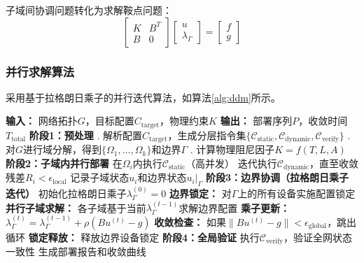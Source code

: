 \documentclass[12pt,a4paper]{article}
\begin{document}
子域间协调问题转化为求解鞍点问题：
\begin{equation}
    \begin{bmatrix}
        K & B^T \\
        B & 0
    \end{bmatrix}
    \begin{bmatrix}
        u \\
        \lambda_{\Gamma}
    \end{bmatrix}
    =
    \begin{bmatrix}
        f \\
        g
    \end{bmatrix}
    \label{eq:saddle_point}
\end{equation}

\subsubsection{并行求解算法}
采用基于拉格朗日乘子的并行迭代算法，如算法\ref{alg:ddm}所示。

\begin{algorithm}[htbp]
\caption{基于拉格朗日乘子的网络配置并行部署算法}
\label{alg:ddm}
\begin{algorithmic}[1]
\State \textbf{输入：} 网络拓扑$G$，目标配置$C_{\text{target}}$，物理约束$K$
\State \textbf{输出：} 部署序列$P$，收敛时间$T_{\text{total}}$
\State
\State \textbf{阶段1：预处理}
. 解析配置$C_{\text{target}}$，生成分层指令集$\{\mathcal{C}_{\text{static}}, \mathcal{C}_{\text{dynamic}}, \mathcal{C}_{\text{verify}}\}$
. 对$G$进行域分解，得到$\{\Omega_1, \ldots, \Omega_k\}$和边界$\Gamma$
. 计算物理阻尼因子$K = f(T, L, A)$
\State
\State \textbf{阶段2：子域内并行部署}
\State {}
\State \quad 在$\Omega_i$内执行$\mathcal{C}_{\text{static}}$（高并发）
\State \quad 迭代执行$\mathcal{C}_{\text{dynamic}}$，直至收敛残差$R_i < \epsilon_{\text{local}}$
\State \quad 记录子域状态$u_i$和边界状态$u_i|_{\Gamma}$
\State \EndFor
\State
\State \textbf{阶段3：边界协调（拉格朗日乘子迭代）}
\State 初始化拉格朗日乘子$\lambda_{\Gamma}^{(0)} = 0$
\State {}
\State \quad \textbf{边界锁定：} 对$\Gamma$上的所有设备实施配置锁定
\State \quad \textbf{并行子域求解：} 各子域基于当前$\lambda_{\Gamma}^{(t-1)}$求解边界配置
\State \quad \textbf{乘子更新：} $\lambda_{\Gamma}^{(t)} = \lambda_{\Gamma}^{(t-1)} + \rho (B u^{(t)} - g)$
\State \quad \textbf{收敛检查：} 如果$\|B u^{(t)} - g\| < \epsilon_{\text{global}}$，跳出循环
\State \quad \textbf{锁定释放：} 释放边界设备锁定
\State \EndFor
\State
\State \textbf{阶段4：全局验证}
\State 执行$\mathcal{C}_{\text{verify}}$，验证全网状态一致性
\State 生成部署报告和收敛曲线
\end{algorithmic}
\end{algorithm}
\end{document}
